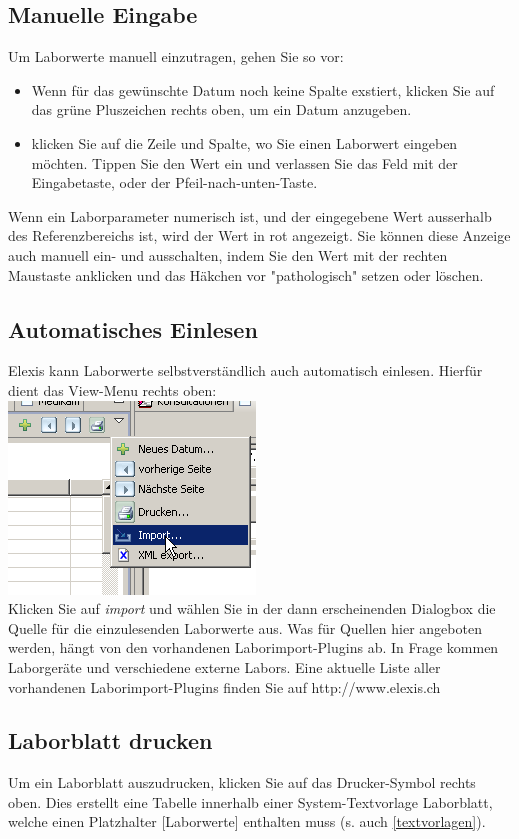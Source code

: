 \subsection{Manuelle Eingabe}
Um Laborwerte manuell einzutragen, gehen Sie so vor:
\begin{itemize}
    \item Wenn für das gewünschte Datum noch keine Spalte exstiert, klicken Sie auf das grüne Pluszeichen rechts oben, um ein Datum anzugeben.
    \item klicken Sie auf die Zeile und Spalte, wo Sie einen Laborwert eingeben möchten. Tippen Sie den Wert ein und verlassen Sie das Feld mit der Eingabetaste, oder der Pfeil-nach-unten-Taste.
\end{itemize}
Wenn ein Laborparameter numerisch ist, und der eingegebene Wert ausserhalb des Referenzbereichs ist, wird der Wert in rot angezeigt. Sie können diese Anzeige auch manuell ein- und ausschalten, indem Sie den Wert mit der rechten Maustaste anklicken und das Häkchen vor "pathologisch" setzen oder löschen.

\subsection{Automatisches Einlesen}
Elexis kann Laborwerte selbstverständlich auch automatisch einlesen. Hierfür dient das View-Menu rechts oben:\\
\includegraphics{images/labor6}\\
Klicken Sie auf \textit{import} und wählen Sie in der dann erscheinenden Dialogbox die Quelle für die einzulesenden Laborwerte aus. Was für Quellen hier angeboten werden, hängt von den vorhandenen Laborimport-Plugins ab. In Frage kommen Laborgeräte und verschiedene externe Labors. Eine aktuelle Liste aller vorhandenen Laborimport-Plugins finden Sie auf http://www.elexis.ch

\subsection{Laborblatt drucken}
Um ein Laborblatt auszudrucken, klicken Sie auf das Drucker-Symbol rechts oben. Dies erstellt eine Tabelle innerhalb einer System-Textvorlage \glqq Laborblatt\grqq{}, welche einen Platzhalter [Laborwerte] enthalten muss (s. auch \ref{textvorlagen}).

